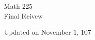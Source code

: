 \documentclass[11pt, letterpaper]{article}
\theoremstyle{definition}
\begin{document}
  \begin{titlepage}
    {\LARGE Math 225} \\ 
    {\large Final Reivew}
    \begin{multicols}{3}
      \tableofcontents
    \end{multicols}
    \vfill 
    Updated on November 1, 107
  \end{titlepage}
  
  \begin{multicols}{3}
    
  \end{multicols}
\end{document}
